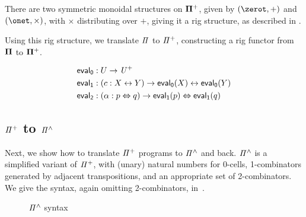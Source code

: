 \begin{proposition}
  There are two symmetric monoidal structures on $\mathbf{\Pi^{+}}$, given by $(\zerot, +)$ and $(\onet, \times)$, with
  $\times$ distributing over $+$, giving it a rig structure, as described in .
\end{proposition}

Using this rig structure, we translate $\mathit{\Pi}$ to $\mathit{{\Pi}^{+}}$, constructing a rig functor from $\mathbf{\Pi}$ to
$\mathbf{\Pi^{+}}$.

\begin{definition}
  \begin{align*}
    \evalt_{0} & : U \to \UPlus                                             \\
    \evalt_{1} & : (c : X \iso Y) \to \evalt_{0}(X) \iso \evalt_{0}(Y)      \\
    \evalt_{2} & : (\alpha : p \Iso q) \to \evalt_{1}(p) \Iso \evalt_{1}(q)
  \end{align*}
\end{definition}

\subsection{$\mathit{{\Pi}^{+}}$ to $\mathit{{\Pi}^{\wedge}}$}

Next, we show how to translate $\mathit{{\Pi}^{+}}$ programs to $\mathit{{\Pi}^{\wedge}}$ and back. $\mathit{{\Pi}^{\wedge}}$ is a simplified variant of
$\mathit{{\Pi}^{+}}$, with (unary) natural numbers for 0-cells, 1-combinators generated by adjacent transpositions, and an
appropriate set of 2-combinators. We give the syntax, again omitting 2-combinators, in~.

\begin{figure}[t]
  {}

  {}
  \caption{$\mathit{{\Pi}^{\wedge}}$ syntax}
  \label{fig:pihat}
\end{figure}

